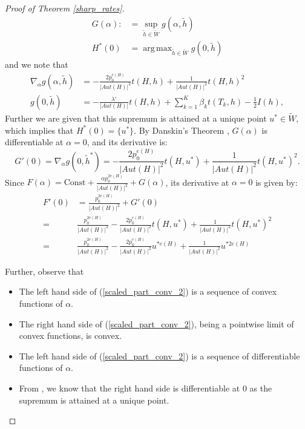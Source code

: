 \documentclass[12pt]{article}
\DeclareMathOperator*{\argmax}{arg\,max}
\numberwithin{equation}{section}
\begin{document}
\begin{proof}[Proof of Theorem \ref{sharp_rates}]
\begin{align*}
G(\alpha):&= \sup_{\tilde{h}\in\tilde{W}} g(\alpha, \tilde{h})\\
H^*(0) &= \argmax_{\tilde{h}\in\tilde{W}} g(0, \tilde{h})
\end{align*}
and we note that
\begin{align*}
\nabla_\alpha g(\alpha, \tilde{h})&= -\frac{2p_0^{e(H)}}{\lvert Aut(H)\rvert^2} t(H,h) + \frac{1}{\lvert Aut(H)\rvert^2} t(H,h)^2\\
g(0, \tilde{h}) &= -\frac{\lambda^{\circ}}{\lvert Aut(H)\rvert} t(H,h) + \sum_{k=1}^K \beta_k t(T_k, h)  - \frac{1}{2} I(h),
\end{align*}
   Further we are given that this supremum is attained at a unique point $u^* \in \tilde{W}$, which implies that  $H^*(0) = \{u^*\}$. By Danskin's Theorem \cite{danskin1966theory}, $G(\alpha)$ is differentiable at $\alpha=0$, and its derivative is:
    $$ G'(0) = \nabla_\alpha g(0, \tilde{h}^*) = -\frac{2p_0^{e(H)}}{\lvert Aut(H)\rvert^2} t(H,u^*) + \frac{1}{\lvert Aut(H)\rvert^2} t(H,u^*)^2.$$
    Since $F(\alpha) = \text{Const} + \frac{\alpha p_0^{2e(H)}}{\lvert Aut(H)\rvert^2} + G(\alpha)$, its derivative at $\alpha=0$ is given by:
    \begin{align*} F'(0) &= \frac{p_0^{2e(H)}}{\lvert Aut(H)\rvert^2} + G'(0)\\
    =&\frac{p_0^{2e(H)}}{\lvert Aut(H)\rvert^2} - \frac{2p_0^{e(H)}}{\lvert Aut(H)\rvert^2} t(H,u^*) + \frac{1}{\lvert Aut(H)\rvert^2}t(H,u^*)^2 \\ =&\frac{p_0^{2e(H)}}{\lvert Aut(H)\rvert^2} - \frac{2p_0^{e(H)}}{\lvert Aut(H)\rvert^2} u^{*{e(H)}} + \frac{1}{\lvert Aut(H)\rvert^2} u^{*{2e(H)}} \end{align*}



Further, observe that

\begin{itemize}
\item The left hand side of (\ref{scaled_part_conv_2}) is a sequence of convex functions  of \(\alpha\).
\item The right hand side of (\ref{scaled_part_conv_2}), being a pointwise limit of convex functions, is convex.
\item The left hand side of (\ref{scaled_part_conv_2}) is a sequence of differentiable functions of \(\alpha\).
\item From \cite{chatterjee2013estimating}, we know that the right hand side is differentiable at $0$ as the supremum is attained at a unique point.
\end{itemize}




\end{proof}
\end{document}
